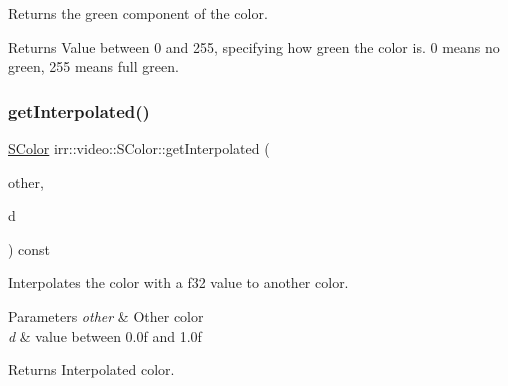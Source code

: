 Returns the green component of the color. 

\begin{DoxyReturn}{Returns}
Value between 0 and 255, specifying how green the color is. 0 means no green, 255 means full green. 
\end{DoxyReturn}
\mbox{\label{classirr_1_1video_1_1SColor_a20bfa471b5cf672db83355c181a3cae6}} 
\subsubsection{\texorpdfstring{get\+Interpolated()}{getInterpolated()}\hspace{0.1cm}{\footnotesize\ttfamily [1/2]}}
{\footnotesize\ttfamily \hyperlink{classirr_1_1video_1_1SColor}{S\+Color} irr\+::video\+::\+S\+Color\+::get\+Interpolated (\begin{DoxyParamCaption}\item[{const \hyperlink{classirr_1_1video_1_1SColor}{S\+Color} \&}]{other,  }\item[{\hyperlink{namespaceirr_a0277be98d67dc26ff93b1a6a1d086b07}{f32}}]{d }\end{DoxyParamCaption}) const\hspace{0.3cm}{\ttfamily [inline]}}



Interpolates the color with a f32 value to another color. 


\begin{DoxyParams}{Parameters}
{\em other} & Other color \\
\hline
{\em d} & value between 0.\+0f and 1.\+0f \\
\hline
\end{DoxyParams}
\begin{DoxyReturn}{Returns}
Interpolated color. 
\end{DoxyReturn}
\mbox{\label{classirr_1_1video_1_1SColor_a20bfa471b5cf672db83355c181a3cae6}} 
